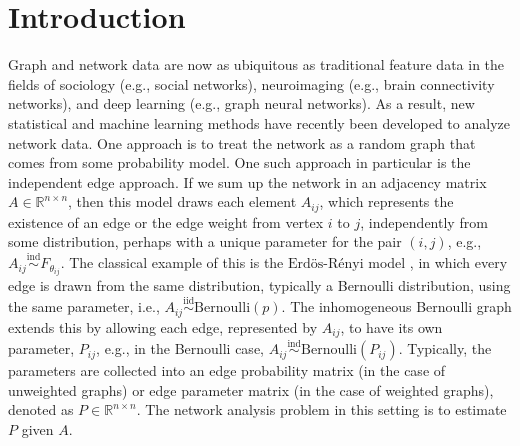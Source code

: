\documentclass[12pt]{article}
\begin{document}
\newcommand{\diag}{\mathrm{diag}}
\newcommand{\tr}{\mathrm{Tr}}
\newcommand{\blockdiag}{\mathrm{blockdiag}}
\newcommand{\indep}{\stackrel{\mathrm{ind}}{\sim}}
\newcommand{\iid}{\stackrel{\mathrm{iid}}{\sim}}
\newcommand{\Bernoulli}{\mathrm{Bernoulli}}
\newcommand{\Betadist}{\mathrm{Beta}}
\newcommand{\BG}{\mathrm{BernoulliGraph}}
\newcommand{\Uniform}{\mathrm{Uniform}}
\newcommand{\PABM}{\mathrm{PABM}}
\newcommand{\RDPG}{\mathrm{RDPG}}
\newcommand{\GRDPG}{\mathrm{GRDPG}}
\newcommand{\Multinomial}{\mathrm{Multinomial}}
\newcommand{\Categorical}{\mathrm{Categorical}}
\newcommand{\dd}{\mathrm{d}}
\newcommand{\as}{\stackrel{\mathrm{a.s.}}{\to}}
\newcommand{\ER}{\text{Erd\"{o}s-R\'{e}nyi}}
\newcommand{\SBM}{\mathrm{SBM}}
\newcommand{\DCBM}{\mathrm{DCBM}}
\newcommand{\rank}{\mathrm{rank}}
\newcommand{\MBM}{\mathrm{MBM}}
\newcommand{\LSM}{\mathrm{LSM}}
\newcommand{\MLSM}{\mathrm{MLSM}}
\newcommand{\Poisson}{\mathrm{Poisson}}
\newtheorem{theorem}{Theorem}
\newtheorem{lemma}{Lemma}
\newtheorem{corollary}{Corollary}
\newtheorem{proposition}{Proposition}
\theoremstyle{remark}
\newtheorem{remark}{Remark}
\theoremstyle{definition}
\newtheorem{definition}{Definition}
\newtheorem{example}{Example}

\section{Introduction}\label{introduction}

Graph and network data are now as ubiquitous as traditional feature data
in the fields of sociology (e.g., social networks), neuroimaging (e.g.,
brain connectivity networks), and deep learning (e.g., graph neural
networks). As a result, new statistical and machine learning methods
have recently been developed to analyze network data. One approach is to
treat the network as a random graph that comes from some probability
model. One such approach in particular is the independent edge approach.
If we sum up the network in an adjacency matrix
\(A \in \mathbb{R}^{n \times n}\), then this model draws each element
\(A_{ij}\), which represents the existence of an edge or the edge weight
from vertex \(i\) to \(j\), independently from some distribution,
perhaps with a unique parameter for the pair \((i,j)\), e.g.,
\(A_{ij} \indep F_{\theta_{ij}}\). The classical example of this is the
\(\ER\) model \citep{Gilbert:1959}, in which every edge is drawn from
the same distribution, typically a Bernoulli distribution, using the
same parameter, i.e., \(A_{ij} \iid \Bernoulli (p)\). The inhomogeneous
Bernoulli graph extends this by allowing each edge, represented by
\(A_{ij}\), to have its own parameter, \(P_{ij}\), e.g., in the
Bernoulli case, \(A_{ij} \indep \Bernoulli(P_{ij})\). Typically, the
parameters are collected into an edge probability matrix (in the case of
unweighted graphs) or edge parameter matrix (in the case of weighted
graphs), denoted as \(P \in \mathbb{R}^{n \times n}\). The network
analysis problem in this setting is to estimate \(P\) given \(A\).
\end{document}
